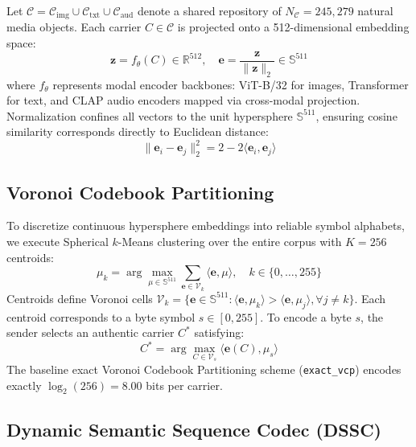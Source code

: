 \documentclass[conference]{IEEEtran}
\begin{document}
Let $\mathcal{C} = \mathcal{C}_{\text{img}} \cup \mathcal{C}_{\text{txt}} \cup \mathcal{C}_{\text{aud}}$ denote a shared repository of $N_{\mathcal{C}} = 245,279$ natural media objects. Each carrier $C \in \mathcal{C}$ is projected onto a 512-dimensional embedding space:
\begin{equation}
\mathbf{z} = f_{\theta}(C) \in \mathbb{R}^{512}, \quad \mathbf{e} = \frac{\mathbf{z}}{\|\mathbf{z}\|_2} \in \mathbb{S}^{511}
\end{equation}
where $f_{\theta}$ represents modal encoder backbones: ViT-B/32 for images, Transformer for text, and CLAP audio encoders mapped via cross-modal projection. Normalization confines all vectors to the unit hypersphere $\mathbb{S}^{511}$, ensuring cosine similarity corresponds directly to Euclidean distance:
\begin{equation}
\|\mathbf{e}_i - \mathbf{e}_j\|_2^2 = 2 - 2\langle \mathbf{e}_i, \mathbf{e}_j \rangle
\end{equation}

\subsection{Voronoi Codebook Partitioning}

To discretize continuous hypersphere embeddings into reliable symbol alphabets, we execute Spherical $k$-Means clustering over the entire corpus with $K = 256$ centroids:
\begin{equation}
\mu_k = \arg\max_{\mu \in \mathbb{S}^{511}} \sum_{\mathbf{e} \in \mathcal{V}_k} \langle \mathbf{e}, \mu \rangle, \quad k \in \{0, \dots, 255\}
\end{equation}
Centroids define Voronoi cells $\mathcal{V}_k = \{\mathbf{e} \in \mathbb{S}^{511} : \langle \mathbf{e}, \mu_k \rangle > \langle \mathbf{e}, \mu_j \rangle, \forall j \neq k\}$. Each centroid corresponds to a byte symbol $s \in [0, 255]$. To encode a byte $s$, the sender selects an authentic carrier $C^*$ satisfying:
\begin{equation}
C^* = \arg\max_{C \in \mathcal{V}_s} \langle \mathbf{e}(C), \mu_s \rangle
\end{equation}
The baseline exact Voronoi Codebook Partitioning scheme (\texttt{exact\_vcp}) encodes exactly $\log_2(256) = 8.00$ bits per carrier.

\subsection{Dynamic Semantic Sequence Codec (DSSC)}
\end{document}

